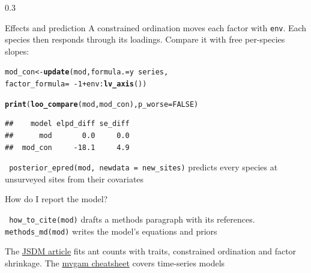 \documentclass[final,9pt,fleqn]{beamer}\usepackage[]{graphicx}\usepackage[]{xcolor}
\makeatletter
\newcommand{\hlnum}[1]{\textcolor[rgb]{0.686,0.059,0.569}{#1}}%
\newcommand{\hlopt}[1]{\textcolor[rgb]{0,0,0}{#1}}%
\newcommand{\hldef}[1]{\textcolor[rgb]{0.345,0.345,0.345}{#1}}%
\newcommand{\hlkwb}[1]{\textcolor[rgb]{0.69,0.353,0.396}{#1}}%
\newcommand{\hlkwc}[1]{\textcolor[rgb]{0.333,0.667,0.333}{#1}}%
\newcommand{\hlkwd}[1]{\textcolor[rgb]{0.737,0.353,0.396}{\textbf{#1}}}%
\newenvironment{kframe}{%
 \def\at@end@of@kframe{}%
 \ifinner\ifhmode%
  \def\at@end@of@kframe{\end{minipage}}%
  \begin{minipage}{\columnwidth}%
 \fi\fi%
 \def\FrameCommand##1{\hskip\@totalleftmargin \hskip-\fboxsep
 \colorbox{shadecolor}{##1}\hskip-\fboxsep
     \hskip-\linewidth \hskip-\@totalleftmargin \hskip\columnwidth}%
 \MakeFramed {\advance\hsize-\width
   \@totalleftmargin\z@ \linewidth\hsize
   \@setminipage}}%
 {\par\unskip\endMakeFramed%
 \at@end@of@kframe}
\newenvironment{knitrout}{}{} %
\makeatother
\begin{document}
\begin{frame}[fragile]
\begin{columns}
\begin{column}{0.3\paperwidth}
\begin{block}{{\fontsize{21}{21} \selectfont \color{BrickRed} Effects and prediction}}
\medskip
A constrained ordination moves each factor with \texttt{env}. Each species then responds through its loadings. Compare it with free per-species slopes:
\begin{knitrout}
\color{fgcolor}\begin{kframe}
\begin{alltt}
\hldef{mod_con} \hlkwb{<-} \hlkwd{update}\hldef{(mod,} \hlkwc{formula.} \hldef{= y} \hlopt{~} \hldef{series,}
                  \hlkwc{factor_formula} \hldef{=} \hlopt{~ -}\hlnum{1} \hlopt{+} \hldef{env}\hlopt{:}\hlkwd{lv_axis}\hldef{())}
\end{alltt}
\end{kframe}
\end{knitrout}
\begin{knitrout}
\color{fgcolor}\begin{kframe}
\begin{alltt}
\hlkwd{print}\hldef{(}\hlkwd{loo_compare}\hldef{(mod, mod_con),} \hlkwc{p_worse} \hldef{=} \hlnum{FALSE}\hldef{)}
\end{alltt}
\begin{verbatim}
##    model elpd_diff se_diff
##      mod       0.0     0.0
##  mod_con     -18.1     4.9
\end{verbatim}
\end{kframe}
\end{knitrout}

\medskip
\texttt{\color{Orchid} posterior\_epred(mod, newdata = new\_sites)} predicts every species at unsurveyed sites from their covariates

\medskip
{{\fontsize{11}{11} \selectfont \color{mygray} How do I report the model?}}

\medskip
\texttt{\color{Orchid} how\_to\_cite(mod)} drafts a methods paragraph with its references. \texttt{\color{Orchid} methods\_md(mod)} writes the model's equations and priors

\medskip
The \href{https://nicholasjclark.github.io/mvgam/articles/jsdgam.html}{JSDM article} fits ant counts with traits, constrained ordination and factor shrinkage. The \href{https://nicholasjclark.github.io/mvgam/cheatsheets/mvgam_cheatsheet.pdf}{mvgam cheatsheet} covers time-series models

\end{block}
\end{column}

\end{columns}
\end{frame}
\end{document}
